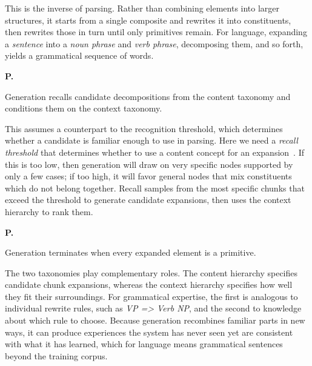 \documentclass[11pt,letterpaper]{article}
\newcounter{ppostulate}
\newenvironment{ppost}{%
  \stepcounter{ppostulate}%
  \par\noindent
  \hangindent=21pt\hangafter=1%
  \textbf{P\theppostulate.}~\ignorespaces
  \setlength{\parindent}{0pt}%
  \setlength{\parskip}{4pt}%
}{%
  \par\smallskip
}
\begin{document}
\vskip 0.02in
\noindent
This is the inverse of parsing. Rather than combining elements into
larger structures, it starts from a single composite and rewrites it
into constituents, then rewrites those in turn until only primitives
remain. For language, expanding a {\sl sentence} into a {\sl noun
phrase} and {\sl verb phrase}, decomposing them, and so forth, 
yields a grammatical sequence of words.

\vskip 0.05in

\begin{ppost}
Generation recalls candidate decompositions from the content taxonomy
and conditions them on the context taxonomy.
\end{ppost}

\vskip 0.02in
\noindent
This assumes a counterpart to the recognition threshold, which
determines whether a candidate is familiar enough to use in parsing.
Here we need a {\it recall threshold\/} that determines whether 
to use a content concept for an  expansion~\citep{gupta2025hierarchicalsemanticretrievalcobweb}. If this is too low, then generation
will draw on very specific nodes supported by only a few cases; if
too high, it will favor general nodes that mix constituents
which do not belong together. Recall samples from the most specific
chunks that exceed the threshold to generate candidate expansions,
then uses the context hierarchy to rank them.


\vskip 0.05in

\begin{ppost}
Generation terminates when every expanded element is a primitive.
\end{ppost}

\vskip 0.02in
\noindent
The two taxonomies play complementary roles. The content
hierarchy specifies candidate chunk expansions, whereas the context
hierarchy specifies how well they fit their surroundings. For
grammatical expertise, the first is analogous to individual rewrite
rules, such as {\sl VP => Verb NP}, and the second to knowledge about
which rule to choose. Because generation recombines familiar parts in
new ways, it can produce experiences the system has never seen yet
are consistent with what it has learned, which for language means
grammatical sentences beyond the training corpus. 

\newpage

\end{document}
